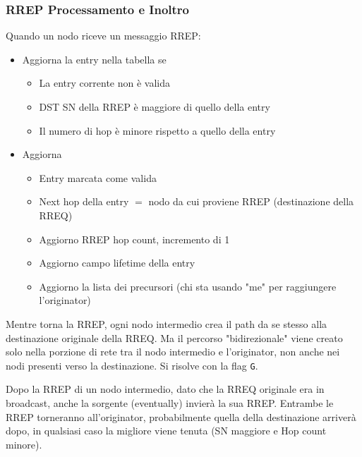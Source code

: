 \subsubsection{RREP Processamento e Inoltro}

Quando un nodo riceve un messaggio RREP:
\begin{itemize}
	\item Aggiorna la entry nella tabella se
	\begin{itemize}
		
        \item La entry corrente non è valida
		
        \item DST SN della RREP è maggiore di quello della entry
		
        \item Il numero di hop è minore rispetto a quello della entry
	\end{itemize}

	\item Aggiorna
	\begin{itemize}
		\item Entry marcata come valida

		\item Next hop della entry $=$ nodo da cui proviene RREP (destinazione della RREQ)

		\item Aggiorno RREP hop count, incremento di 1

		\item Aggiorno campo lifetime della entry

		\item Aggiorno la lista dei precursori (chi sta usando "me" per raggiungere l'originator)
	\end{itemize}
\end{itemize}

Mentre torna la RREP, ogni nodo intermedio crea il path da se stesso alla destinazione originale della RREQ. Ma il percorso "bidirezionale" viene creato solo nella porzione di rete tra il nodo intermedio e l'originator, non anche nei nodi presenti verso la destinazione. Si risolve con la flag \texttt{G}.

Dopo la RREP di un nodo intermedio, dato che la RREQ originale era in broadcast, anche la sorgente (eventually) invierà la sua RREP. Entrambe le RREP torneranno all'originator, probabilmente quella della destinazione arriverà dopo, in qualsiasi caso la migliore viene tenuta (SN maggiore e Hop count minore).

